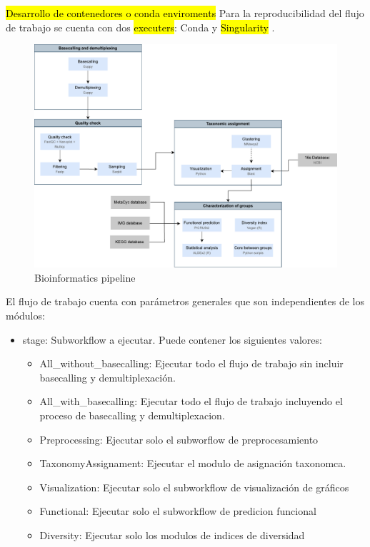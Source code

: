 \begin{itemize}
\hl{Desarrollo de contenedores o conda enviroments}
Para la reproducibilidad del flujo de trabajo se cuenta con dos \hl{executers}: Conda y \hl{Singularity}    .
\begin{figure}[H]
    \centering
    \includegraphics[width=1\linewidth]{images/pipeline.pdf}
    \caption{Bioinformatics pipeline}
    \label{fig:pipeline}
\end{figure}
El flujo de trabajo cuenta con parámetros generales que son independientes de los módulos:
\begin{itemize}
    \item stage: Subworkflow a ejecutar. Puede contener los siguientes valores:
          \begin{itemize}
              \item All\_without\_basecalling: Ejecutar todo el flujo de trabajo sin incluir basecalling y demultiplexación.
              \item All\_with\_basecalling: Ejecutar todo el flujo de trabajo incluyendo el proceso de basecalling y demultiplexacion.
              \item Preprocessing: Ejecutar solo el subworflow de preprocesamiento
              \item TaxonomyAssignament: Ejecutar el modulo de asignación taxonomca.
              \item Visualization: Ejecutar solo el subworkflow de visualización de gráficos
              \item Functional: Ejecutar solo el subworkflow de predicion funcional
              \item Diversity: Ejecutar solo los modulos de indices de diversidad


\end{itemize}
\end{itemize}
\end{itemize}
